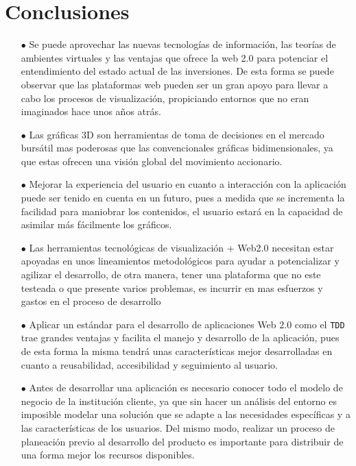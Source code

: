 \chapter{Conclusiones}
\begin{itemize}

\item[$\bullet$] Se puede aprovechar las nuevas tecnologías de información, las teorías de ambientes virtuales y las ventajas que ofrece la web 2.0 para potenciar el entendimiento del estado actual de las inversiones. De esta forma se puede observar que las plataformas web pueden ser un gran apoyo para llevar a cabo los procesos de visualización, propiciando entornos que no eran imaginados hace unos años atrás.

\item[$\bullet$] Las gráficas 3D son herramientas de toma de decisiones en el mercado bursátil mas poderosas que las convencionales gráficas bidimensionales, ya que estas ofrecen una visión global del movimiento accionario.

\item[$\bullet$] Mejorar la experiencia del usuario en cuanto a interacción con la aplicación puede ser tenido en cuenta en un futuro, pues a medida que se incrementa la facilidad para maniobrar los contenidos, el usuario estará en la capacidad de asimilar más fácilmente los gráficos.

\item[$\bullet$] Las herramientas tecnológicas de visualización + Web2.0 necesitan estar apoyadas en unos lineamientos metodológicos para ayudar a potencializar y agilizar el desarrollo, de otra manera, tener una plataforma que no este testeada o que presente varios problemas, es incurrir en mas esfuerzos y gastos en el proceso de desarrollo

\item[$\bullet$] Aplicar un estándar para el desarrollo de aplicaciones Web 2.0 como el \texttt{TDD} trae grandes ventajas y facilita el manejo y desarrollo de la aplicación, pues de esta forma la misma tendrá unas características mejor desarrolladas en cuanto a reusabilidad, accesibilidad y seguimiento al usuario.

\item[$\bullet$] Antes de desarrollar una aplicación es necesario conocer todo el modelo de negocio de la institución cliente, ya que sin hacer un análisis del entorno es imposible modelar una solución que se adapte a las necesidades específicas y a las características de los usuarios. Del mismo modo, realizar un proceso de planeación previo al desarrollo del producto es importante para distribuir de una forma mejor los recursos disponibles.


\end{itemize}
